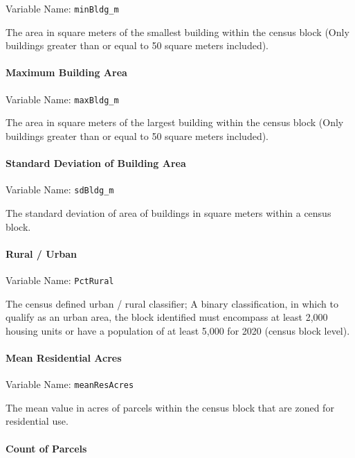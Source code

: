 \documentclass[
  letterpaper,
  DIV=11,
  numbers=noendperiod,
  oneside]{scrartcl}
\let\oldparagraph\paragraph
\renewcommand{\paragraph}[1]{\oldparagraph{#1}\mbox{}}
\begin{document}
Variable Name: \texttt{minBldg\_m}

The area in square meters of the smallest building within the census
block (Only buildings greater than or equal to 50 square meters
included).

\paragraph{Maximum Building Area}\label{maximum-building-area}

Variable Name: \texttt{maxBldg\_m}

The area in square meters of the largest building within the census
block (Only buildings greater than or equal to 50 square meters
included).

\paragraph{Standard Deviation of Building
Area}\label{standard-deviation-of-building-area}

Variable Name: \texttt{sdBldg\_m}

The standard deviation of area of buildings in square meters within a
census block.

\paragraph{Rural / Urban}\label{rural-urban}

Variable Name: \texttt{PctRural}

The census defined urban / rural classifier; A binary classification, in
which to qualify as an urban area, the block identified must encompass
at least 2,000 housing units or have a population of at least 5,000 for
2020 (census block level).

\paragraph{Mean Residential Acres}\label{mean-residential-acres}

Variable Name: \texttt{meanResAcres}

The mean value in acres of parcels within the census block that are
zoned for residential use.

\paragraph{Count of Parcels}\label{count-of-parcels}
\end{document}
